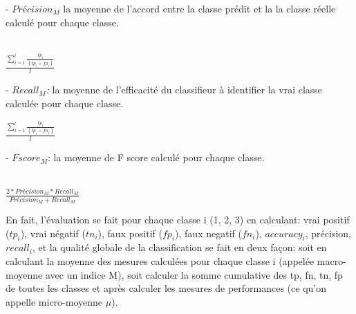 \documentclass{article}
\numberwithin{equation}{section}
\begin{document}
- $Précision_{M}$ la moyenne de l'accord entre la classe prédit et la la classe réelle calculé pour chaque classe.\\\\
\begin{center}
$\frac{\sum_{i=1}^{l} \frac{tp_i}{(tp_i + fp_i)}}{l}$
\end{center}

- \textit{$Recall_{M}$: } la moyenne de l'efficacité du classifieur à identifier la vrai classe calculée pour chaque classe.\\
\begin{center}
$\frac{\sum_{i=1}^{l} \frac{tp_i}{(tp_i + fn_i)}}{l}$
\end{center}

- \textit{$Fscore_{M}$}: la moyenne de F score calculé pour chaque classe.\\\\
\begin{center}
$\frac{2 * Précision_{M} * Recall_{M}}{Précision_{M} + Recall_{M}}$
\end{center}


En fait, l'évaluation se fait pour chaque classe i (1, 2, 3) en calculant:  vrai positif ($tp_i$), vrai négatif ($tn_i$), faux positif ($fp_i$), faux negatif ($fn_i$), \textit{$accuracy_i$}, précision, \textit{$recall_i$}, et la qualité globale de la classification se fait en deux façon: soit en calculant la moyenne des mesures calculées  pour chaque classe i (appelée macro-moyenne avec un indice M), soit calculer la somme cumulative  des tp, fn, tn, fp de toutes les classes et après calculer les mesures de performances (ce qu'on appelle micro-moyenne $\mu$).
\end{document}
